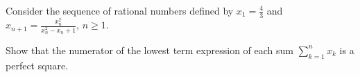 Consider the sequence of rational numbers defined by $x_1=\frac{4}{3}$ and $x_{n+1}=\frac{x_n^2}{x_n^2-x_n+1}$, $n\geq 1$.

Show that the numerator of the lowest term expression of each sum $\sum_{k=1}^{n}x_k$ is a perfect square.